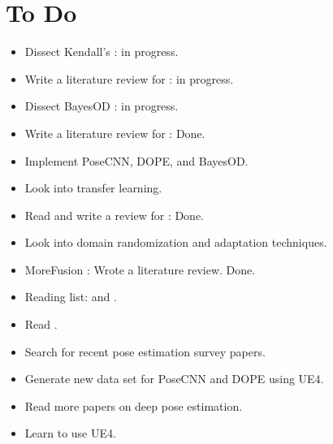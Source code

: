 \documentclass[11pt]{article}
\begin{document}
\section{To Do}
\begin{itemize}
    \item Dissect Kendall's \cite{kendall2017uncertainties}: in progress. 
    \item Write a literature review for \cite{kendall2017uncertainties}: in progress.
    \item Dissect BayesOD \cite{harakeh2020bayesod}: in progress.
    \item Write a literature review for \cite{harakeh2020bayesod}: Done.
    \item Implement PoseCNN, DOPE, and BayesOD.
	\item Look into transfer learning. 
	\item Read and write a review for \cite{tobin2017domain}: Done. 
	\item Look into domain randomization and adaptation techniques.
	\item MoreFusion \cite{MoreFusion}: Wrote a literature review. Done.
	\item Reading list: \cite{lampinen2001bayesian} and \cite{li2019survey}.
    \item Read \cite{choi2013rgb}.
    \item Search for recent pose estimation survey papers.
    \item Generate new data set for PoseCNN and DOPE using UE4. 
	\item Read more papers on deep pose estimation. \item Learn to use UE4. 

\end{itemize}
\end{document}
